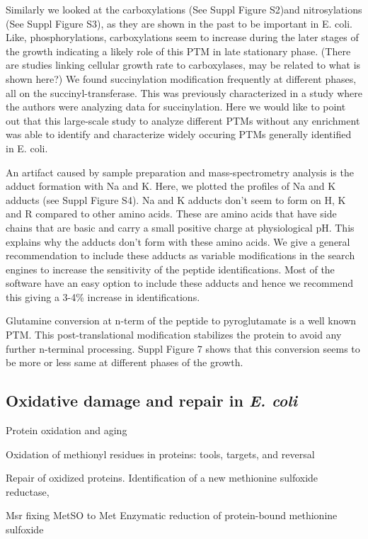\documentclass[12pt]{article}
\begin{document}
Similarly we looked at the carboxylations (See Suppl Figure S2)and nitrosylations (See Suppl Figure S3), as they are shown in the past to be important in E. coli. Like, phosphorylations, carboxylations seem to increase during the later stages of the growth indicating a likely role of this PTM in late stationary phase. (There are studies linking cellular growth rate to carboxylases, may be related to what is shown here?) We found succinylation modification frequently at different phases, all on the succinyl-transferase. This was previously characterized in a study where the authors were analyzing data for succinylation. Here we would like to point out that this large-scale study to analyze different PTMs without any enrichment was able to identify and characterize widely occuring PTMs generally identified in E. coli. 

An artifact caused by sample preparation and mass-spectrometry analysis is the adduct formation with Na and K. Here, we plotted the profiles of Na and K adducts (see Suppl Figure S4). Na and K adducts don't seem to form on H, K and R compared to other amino acids. These are amino acids that have side chains that are basic and carry a small positive charge at physiological pH. This explains why the adducts don't form with these amino acids. We give a general recommendation to include these adducts as variable modifications in the search engines to increase the sensitivity of the peptide identifications. Most of the software have an easy option to include these adducts and hence we recommend this giving a 3-4\% increase in identifications.

Glutamine conversion at n-term of the peptide to pyroglutamate is a well known PTM. This post-translational modification stabilizes the protein to avoid any further n-terminal processing. Suppl Figure 7 shows that this conversion seems to be more or less same at different phases of the growth.

\subsection{Oxidative damage and repair in \emph{E. coli}}
\cite{Stadtman1992}
{Protein oxidation and aging}

\cite{Vogt1995}
{Oxidation of methionyl residues in proteins: tools, targets, and reversal}

\cite{Grimaudetal2001}
{Repair of oxidized proteins. Identification of a new methionine sulfoxide reductase},

Msr fixing MetSO to Met \cite{Brotetal1981}
{Enzymatic reduction of protein-bound methionine sulfoxide}
\end{document}
